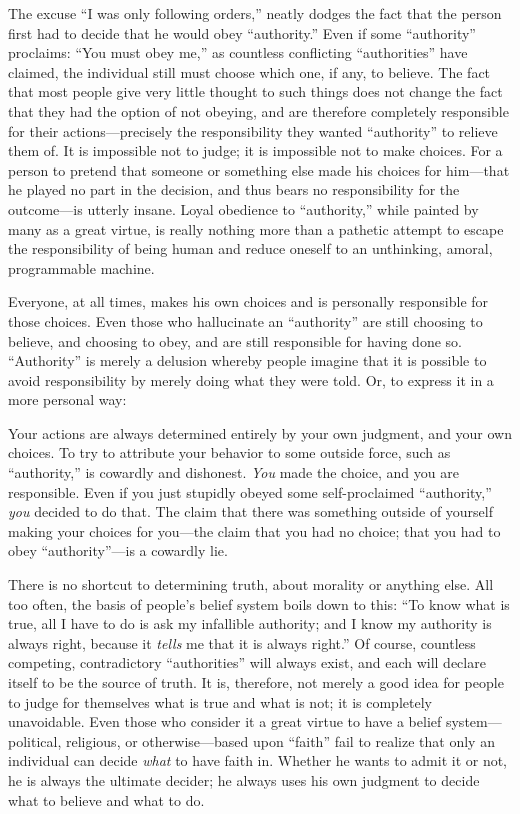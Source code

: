 \documentclass{book}
\begin{document}
The excuse \enquote{I was only following orders,} neatly dodges the fact that the person first had to decide that he would obey \enquote{authority.} Even if some \enquote{authority} proclaims: \enquote{You must obey me,} as countless conflicting \enquote{authorities} have claimed, the individual still must choose which one, if any, to believe. The fact that most people give very little thought to such things does not change the fact that they had the option of not obeying, and are therefore completely responsible for their actions---precisely the responsibility they wanted \enquote{authority} to relieve them of. It is impossible not to judge; it is impossible not to make choices. For a person to pretend that someone or something else made his choices for him---that he played no part in the decision, and thus bears no responsibility for the outcome---is utterly insane. Loyal obedience to \enquote{authority,} while painted by many as a great virtue, is really nothing more than a pathetic attempt to escape the responsibility of being human and reduce oneself to an unthinking, amoral, programmable machine.

Everyone, at all times, makes his own choices and is personally responsible for those choices. Even those who hallucinate an \enquote{authority} are still choosing to believe, and choosing to obey, and are still responsible for having done so. \enquote{Authority} is merely a delusion whereby people imagine that it is possible to avoid responsibility by merely doing what they were told. Or, to express it in a more personal way:

Your actions are always determined entirely by your own judgment, and your own choices. To try to attribute your behavior to some outside force, such as \enquote{authority,} is cowardly and dishonest. \emph{You} made the choice, and you are responsible. Even if you just stupidly obeyed some self-proclaimed \enquote{authority,} \emph{you} decided to do that. The claim that there was something outside of yourself making your choices for you---the claim that you had no choice; that you had to obey \enquote{authority}---is a cowardly lie.

There is no shortcut to determining truth, about morality or anything else. All too often, the basis of people's belief system boils down to this: \enquote{To know what is true, all I have to do is ask my infallible authority; and I know my authority is always right, because it \emph{tells} me that it is always right.} Of course, countless competing, contradictory \enquote{authorities} will always exist, and each will declare itself to be the source of truth. It is, therefore, not merely a good idea for people to judge for themselves what is true and what is not; it is completely unavoidable. Even those who consider it a great virtue to have a belief system---political, religious, or otherwise---based upon \enquote{faith} fail to realize that only an individual can decide \emph{what} to have faith in. Whether he wants to admit it or not, he is always the ultimate decider; he always uses his own judgment to decide what to believe and what to do.
\end{document}
